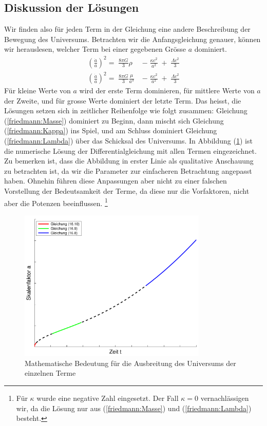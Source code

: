 \begin{refsection}
\subsection*{Diskussion der Lösungen}
Wir finden also für jeden Term in der Gleichung eine andere Beschreibung der Bewegung des Universums. Betrachten wir die Anfangsgleichung genauer, können wir herauslesen, welcher Term bei einer gegebenen Grösse $a$ dominiert.
\begin{align*}
\left(\frac{\dot{a}}{a}\right) ^2 =\;\frac{8 \pi G}{3} \rho\; &- \;\frac{\kappa c^2}{a^2}\; + \;\frac{\Lambda c^2}{3} \\
\left(\frac{\dot{a}}{a}\right) ^2 = \;\frac{8 \pi G}{3} \frac{\mu}{a^3}\; &-\;\frac{\kappa c^2}{a^2}\; +\; \frac{\Lambda c^2}{3}
\end{align*}
Für kleine Werte von $a$ wird der erste Term dominieren, für mittlere Werte von $a$ der Zweite, und für grosse Werte dominiert der letzte Term. Das heisst, die Lösungen setzen sich in zeitlicher Reihenfolge wie folgt zusammen:
Gleichung (\ref{friedmann:Masse})  dominiert zu Beginn, dann mischt sich Gleichung (\ref{friedmann:Kappa}) ins Spiel, und am Schluss dominiert Gleichung (\ref{friedmann:Lambda}) über das Schicksal des Universums. In Abbildung (\ref{friedmann:mathematischFriedmann}) ist die numerische Lösung der Differentialgleichung mit allen Termen eingezeichnet.
Zu bemerken ist, dass die Abbildung in erster Linie als qualitative Anschauung zu betrachten ist, da wir die Parameter zur einfacheren Betrachtung angepasst haben. Ohnehin führen diese Anpassungen aber nicht zu einer falschen Vorstellung der Bedeutsamkeit der Terme, da diese nur die Vorfaktoren, nicht aber die Potenzen beeinflussen. 
\footnote{Für $\kappa$ wurde eine negative Zahl eingesetzt. Der Fall $\kappa = 0$ vernachlässigen wir, da die Lösung nur aus (\ref{friedmann:Masse}) und (\ref{friedmann:Lambda}) besteht.}
\begin{figure}[h]
	\centering
	\includegraphics[width = 0.8\textwidth]{friedmann/images/mathematischFriedmann.pdf}
	\caption{Mathematische Bedeutung für die Ausbreitung des Universums der einzelnen Terme}
	\label{friedmann:mathematischFriedmann}
\end{figure}%

\end{refsection}
